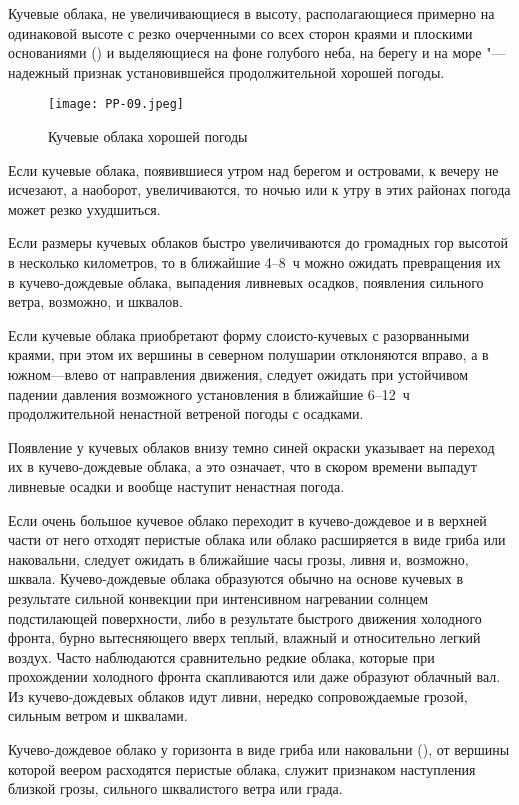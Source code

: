  Кучевые облака, не увеличивающиеся в высоту, располагающиеся
примерно на одинаковой высоте с резко очерченными со всех сторон
краями и плоскими основаниями () и выделяющиеся на фоне
голубого неба, на берегу и на море "--- надежный признак установившейся
продолжительной хорошей погоды.

\begin{figure}[htb]
  \centering{}
  \texttt{[image: PP-09.jpeg]}
  \caption{Кучевые облака хорошей погоды}
  \label{fig:pp09}
  \small
  \centering{}
\end{figure}

 Если кучевые облака, появившиеся утром над берегом и островами,
к вечеру не исчезают, а наоборот, увеличиваются, то ночью или к утру в
этих районах погода может резко ухудшиться.

 Если размеры кучевых облаков быстро увеличиваются до громадных
гор высотой в несколько километров, то в ближайшие 4--8~ч можно ожидать
превращения их в кучево-дождевые облака, выпадения ливневых осадков,
появления сильного ветра, возможно, и шквалов.

 Если кучевые облака приобретают форму слоисто-кучевых с
разорванными краями, при этом их вершины в северном полушарии
отклоняются вправо, а в южном—влево от направления движения, следует
ожидать при устойчивом падении давления возможного установления в
ближайшие 6--12~ч продолжительной ненастной ветреной погоды с
осадками.

 Появление у кучевых облаков внизу темно синей окраски указывает
на переход их в кучево-дождевые облака, а это означает, что в скором
времени выпадут ливневые осадки и вообще наступит ненастная погода.

 Если очень большое кучевое облако переходит в кучево-дождевое и
в верхней части от него отходят перистые облака или облако расширяется
в виде гриба или наковальни, следует ожидать в ближайшие часы грозы,
ливня и, возможно, шквала. Кучево-дождевые облака образуются обычно на
основе кучевых в результате сильной конвекции при интенсивном
нагревании солнцем подстилающей поверхности, либо в результате
быстрого движения холодного фронта, бурно вытесняющего вверх теплый,
влажный и относительно легкий воздух. Часто наблюдаются сравнительно
редкие облака, которые при прохождении холодного фронта скапливаются
или даже образуют облачный вал. Из кучево-дождевых облаков идут ливни,
нередко сопровождаемые грозой, сильным ветром и шквалами.

 Кучево-дождевое облако у горизонта в виде гриба или наковальни
(), от вершины которой веером расходятся перистые облака,
служит признаком наступления близкой грозы, сильного шквалистого ветра
или града.

